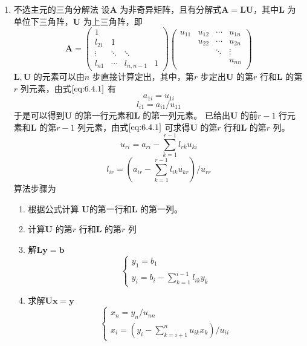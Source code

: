 \documentclass[a4paper]{article}
\begin{document}
\begin{enumerate}
	\item 不选主元的三角分解法
		设$\mathbf{A}$ 为非奇异矩阵，且有分解式$\mathbf{A} = \mathbf{LU}$，其中$\mathbf{L}$ 为单位下三角阵，$\mathbf{U}$ 为上三角阵，即
		\[
			\tag{6.4.1} \label{eq:6.4.1} 
		\mathbf{A} = \begin{pmatrix} 
			1 & & & \\
			l_{21} & 1 & & \\
			\vdots & \ddots & \ddots & \\
			l_{n1} & \cdots & l_{n,n-1} & 1
		\end{pmatrix} 
		\begin{pmatrix} 
			u_{11} & u_{12} & \cdots & u_{1n} \\
			       & u_{22} & \cdots & u_{2n} \\
			       & & \ddots & \vdots \\
			       & & & u_{nn} \\
		\end{pmatrix} 
		\] 
		$\mathbf{L,U}$ 的元素可以由$n$ 步直接计算定出，其中，第$r$ 步定出$\mathbf{U}$ 的第$r$ 行和$\mathbf{L}$ 的第$r$ 列元素，由式$\ref{eq:6.4.1}$ 有
		\[
			a_{1i} = u_{1i}
		\] 
		\[
			l_{i1} = a_{i1} / u_{11}
		\] 
		于是可以得到$\mathbf{U}$ 的第一行元素和$\mathbf{L}$ 的第一列元素。
		已给出$\mathbf{U}$ 的前$r-1$ 行元素和$\mathbf{L}$ 的第$r-1$ 列元素，由式$\ref{eq:6.4.1}$ 可求得$\mathbf{U}$ 的第$r$ 行和$\mathbf{L}$ 的第$r$ 列。
		\[
			u_{ri} = a_{ri} - \sum_{k=1}^{r-1} l_{rk} u_{ki}
		\] 
		\[
			l_{ir} = (a_{ir} - \sum_{k=1}^{r-1} l_{ik} u_{kr}) / u_{rr}
		\] 
		算法步骤为
		\begin{enumerate}
			\item 根据公式计算 $\mathbf{U}$的第一行和$\mathbf{L}$ 的第一列。
			\item 计算$\mathbf{U}$ 的第$r$ 行和$\mathbf{L}$ 的第$r$ 列
			\item 解$\mathbf{Ly} = \mathbf{b}$ 
				\[
					\tag{6.4.2} \label{eq:6.4.2} 
				\begin{cases}
					y_1 = b_1 \\
					y_{i} = b_{i} - \sum_{k=1}^{i-1} l_{ik} y_k
				\end{cases} 
				\] 
			\item 求解$\mathbf{Ux} = \mathbf{y}$ 
				\[
				\tag{6.4.3} \label{eq:6.4.3} 
				\begin{cases}
					x_{n} = y_{n} / u_{nn} \\
					x_{i} = (y_{i} - \sum_{k=i+1}^{n} u_{ik} x_{k}) / u_{ii}
				\end{cases} 
\]
\end{enumerate}
\end{enumerate}
\end{document}
